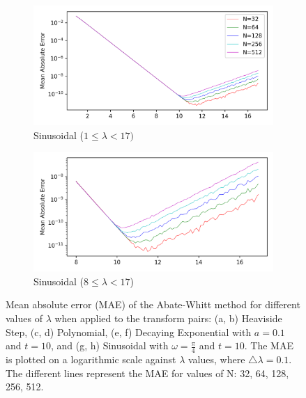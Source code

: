 \documentclass[a4paper]{report}
\begin{document}
\begin{figure}[H]
    \begin{subfigure}{.45\linewidth}
      \includegraphics[width=\linewidth]{images/abate_whitt/sinusoidal.png}
      \caption{Sinusoidal ($1 \leq \lambda < 17)$}
    \end{subfigure}\hfill
    \begin{subfigure}{.45\linewidth}
      \includegraphics[width=\linewidth]{images/abate_whitt/sinusoidal_zoomed.png}
      \caption{Sinusoidal ($8 \leq \lambda < 17$)}
    \end{subfigure}
    
    \caption{Mean absolute error (MAE) of the Abate-Whitt method for different values of $\lambda$ when applied to the transform pairs: (a, b) Heaviside Step, (c, d) Polynomial, (e, f) Decaying Exponential with $a = 0.1$ and $t = 10$, and (g, h) Sinusoidal with $\omega = \frac{\pi}{4}$ and $t = 10$. The MAE is plotted on a logarithmic scale against $\lambda$ values, where $\triangle \lambda = 0.1$. The different lines represent the MAE for values of N: 32, 64, 128, 256, 512.}
    \label{fig:MAE_Abate_Whitt}
\end{figure}
\end{document}
